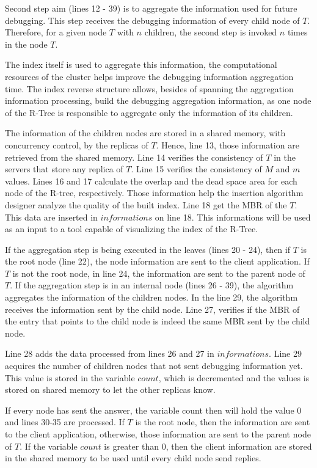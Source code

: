 	Second step aim (lines 12 - 39) is to aggregate the information used for future debugging. This step receives the debugging information of every child node of $T$. Therefore, for a given node $T$ with $n$ children, the second step is invoked $n$ times in the node $T$.

	The index itself is used to aggregate this information, the computational resources of the cluster helps improve the debugging information aggregation time. The index reverse structure allows, besides of spanning the aggregation information processing, build the debugging aggregation information, as one node of the R-Tree is responsible to aggregate only the information of its children. 

	The information of the children nodes are stored in a shared memory, with concurrency control, by the replicas of $T$. Hence, line 13, those information are retrieved from the shared memory. Line 14 verifies the consistency of $T$ in the servers that store any replica of $T$. Line 15 verifies the consistency of $M$ and $m$ values. Lines 16 and 17 calculate the overlap and the dead space area for each node of the R-tree, respectively. Those information help the insertion algorithm designer analyze the quality of the built index. Line 18 get the MBR of the $T$. This data are inserted in $informations$ on line 18. This informations will be used as an input to a tool capable of visualizing the index of the R-Tree.
	
	If the aggregation step is being executed in the leaves (lines 20 - 24), then if  $T$ is the root node (line 22), the node information are sent to the client application. If $T$ is not the root node, in line 24, the information are sent to the parent node of $T$. If the aggregation step is in an internal node (lines 26 - 39), the algorithm aggregates the information of the children nodes. In the line 29, the algorithm receives the information sent by the child node. Line 27, verifies if the MBR of the entry that points to the child node is indeed the same MBR sent by the child node.
	
	Line 28 adds the data processed from lines 26 and 27 in $informations$. Line 29 acquires the number of children nodes that not sent debugging information yet. This value is stored in the variable $count$, which is decremented and the values is stored on shared memory to let the other replicas know.
	
	If every node has sent the answer, the variable count then will hold the value 0 and lines 30-35 are processed. If $T$ is the root node, then the information are sent to the client application, otherwise, those information are sent to the parent node of $T$. If the variable $count$ is greater than 0, then the client information are stored in the shared memory to be used until every child node send replies.	
		
